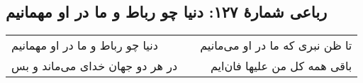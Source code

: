 \begin{center}
\section*{رباعی شمارهٔ ۱۲۷:  دنیا چو رباط و ما در او مهمانیم}
\label{sec:127}
\begin{longtable}{l p{0.5cm} r}
 دنیا چو رباط و ما در او مهمانیم
&&
تا ظن نبری که ما در او می‌مانیم
\\
در هر دو جهان خدای می‌ماند و بس
&&
باقی همه کل من علیها فان‌ایم 
\\
\end{longtable}
\end{center}
